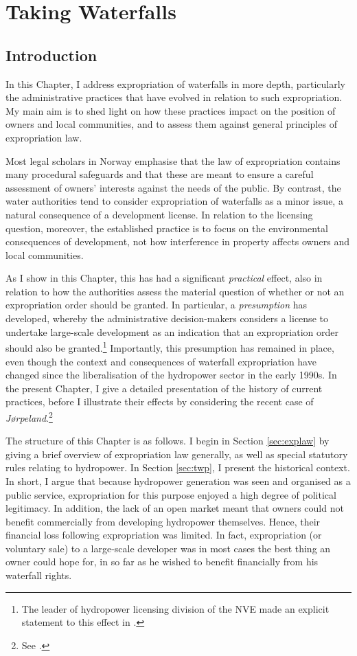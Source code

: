 \chapter{Taking Waterfalls}\label{chap:4}

\section{Introduction}\label{sec:intro4}

In this Chapter, I address expropriation of waterfalls in more depth, particularly the administrative practices that have evolved in relation to such expropriation. My main aim is to shed light on how these practices impact on the position of owners and local communities, and to assess them against general principles of expropriation law. 

Most legal scholars in Norway emphasise that the law of expropriation contains many procedural safeguards and that these are meant to ensure a careful assessment of owners' interests against the needs of the public. By contrast, the water authorities tend to consider expropriation of waterfalls as a minor issue, a natural consequence of a development license. In relation to the licensing question, moreover, the established practice is to focus on the environmental consequences of development, not how interference in property affects owners and local communities.

As I show in this Chapter, this has had a significant {\it practical} effect, also in relation to how the authorities assess the material question of whether or not an expropriation order should be granted. In particular, a {\it presumption} has developed, whereby the administrative decision-makers considers a license to undertake large-scale development as an indication that an expropriation order should also be granted.\footnote{The leader of hydropower licensing division of the NVE made an explicit statement to this effect in \cite{flatby08}.} Importantly, this presumption has remained in place, even though the context and consequences of waterfall expropriation have changed since the liberalisation of the hydropower sector in the early 1990s. In the present Chapter, I give a detailed presentation of the history of current practices, before I illustrate their effects by considering the recent case of {\it Jørpeland}.\footnote{See \cite{jorpeland11}.}

The structure of this Chapter is as follows. I begin in Section \ref{sec:explaw} by giving a brief overview of expropriation law generally, as well as special statutory rules relating to hydropower. In Section \ref{sec:twp}, I present the historical context. In short, I argue that because hydropower generation was seen and organised as a public service, expropriation for this purpose enjoyed a high degree of political legitimacy. In addition, the lack of an open market meant that owners could not benefit commercially from developing hydropower themselves. Hence, their financial loss following expropriation was limited. In fact, expropriation (or voluntary sale) to a large-scale developer was in most cases the best thing an owner could hope for, in so far as he wished to benefit financially from his waterfall rights.

